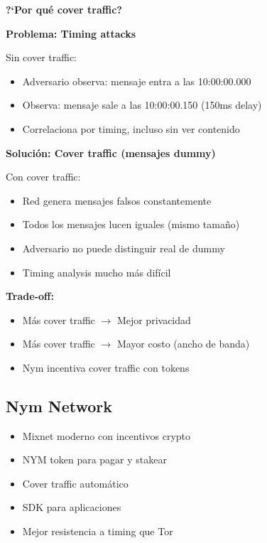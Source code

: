 \documentclass[11pt,a4paper,twoside]{book}
\begin{document}
\begin{keyidea}
\textbf{?`Por qu\'e cover traffic?}

\textbf{Problema: Timing attacks}

Sin cover traffic:
\begin{itemize}
    \item Adversario observa: mensaje entra a las 10:00:00.000
    \item Observa: mensaje sale a las 10:00:00.150 (150ms delay)
    \item Correlaciona por timing, incluso sin ver contenido
\end{itemize}

\textbf{Soluci\'on: Cover traffic (mensajes dummy)}

Con cover traffic:
\begin{itemize}
    \item Red genera mensajes falsos constantemente
    \item Todos los mensajes lucen iguales (mismo tama\~no)
    \item Adversario no puede distinguir real de dummy
    \item Timing analysis mucho m\'as dif\'icil
\end{itemize}

\textbf{Trade-off:}
\begin{itemize}
    \item M\'as cover traffic $\to$ Mejor privacidad
    \item M\'as cover traffic $\to$ Mayor costo (ancho de banda)
    \item Nym incentiva cover traffic con tokens
\end{itemize}
\end{keyidea}

\subsection{Nym Network}

\begin{itemize}
    \item Mixnet moderno con incentivos crypto
    \item NYM token para pagar y stakear
    \item Cover traffic autom\'atico
    \item SDK para aplicaciones
    \item Mejor resistencia a timing que Tor
\end{itemize}
\end{document}
